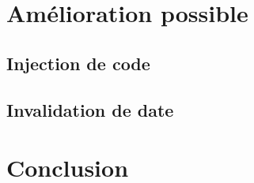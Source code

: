 \chapter{Amélioration possible}

\section{Injection de code}

\section{Invalidation de date}

\chapter{Conclusion}
\label{chapter:bilan}

